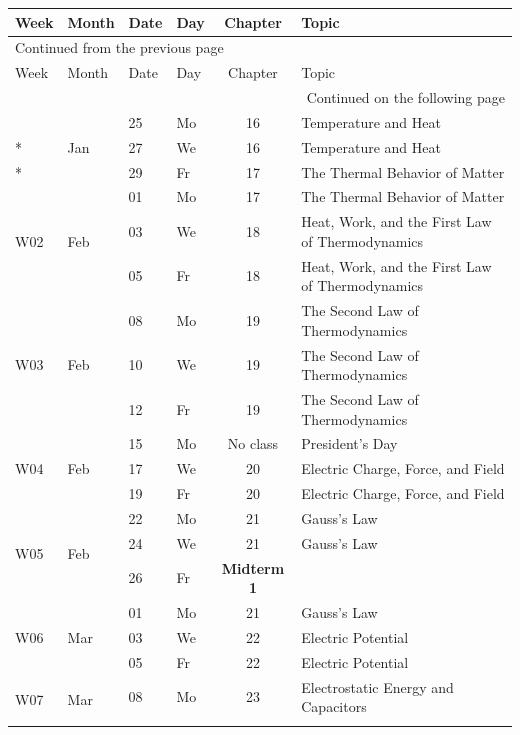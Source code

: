 \documentclass[12pt]{article}
\newcommand{\scheduleheading}{%
    Week & Month & Date & Day & Chapter & Topic \\ \hline
}
\begin{document}
\begin{longtable}{llllcl}
%
\scheduleheading
\endfirsthead
%
\multicolumn{6}{l}{Continued from the previous page} \\ \hline
\scheduleheading
\endhead
%
\multicolumn{6}{r}{Continued on the following page} \\
\endfoot
%
\endlastfoot
%
%
\multirow{3}{*}{W01}	&	\multirow{3}{*}{Jan}	&	25	&	Mo\rule{0pt}{11pt}	&	16	&	Temperature and Heat	\\*	
	&		&	27	&	We	&	16	&	Temperature and Heat	\\*	
	&		&	29	&	Fr	&	17	&	The Thermal Behavior of Matter	\\	\hline
\multirow{3}{*}{W02}	&	\multirow{3}{*}{Feb}	&	01	&	Mo\rule{0pt}{11pt}	&	17	&	The Thermal Behavior of Matter	\\*	
	&		&	03	&	We	&	18	&	Heat, Work, and the First Law of Thermodynamics	\\*	
	&		&	05	&	Fr	&	18	&	Heat, Work, and the First Law of Thermodynamics	\\	\hline
\multirow{3}{*}{W03}	&	\multirow{3}{*}{Feb}	&	08	&	Mo\rule{0pt}{11pt}	&	19	&	The Second Law of Thermodynamics  	\\*	
	&		&	10	&	We	&	19	&	The Second Law of Thermodynamics  	\\*	
	&		&	12	&	Fr	&	19	&	The Second Law of Thermodynamics  	\\	\hline
\multirow{3}{*}{W04}	&	\multirow{3}{*}{Feb}	&	15	&	Mo\rule{0pt}{11pt}	&	No class	&	President's Day	\\*	
	&		&	17	&	We	&	20	&	Electric Charge, Force, and Field	\\*	
	&		&	19	&	Fr	&	20	&	Electric Charge, Force, and Field	\\	\hline
\multirow{3}{*}{W05}	&	\multirow{3}{*}{Feb}	&	22	&	Mo\rule{0pt}{11pt}	&	21	&	Gauss’s Law	\\*	
	&		&	24	&	We	&	21	&	Gauss’s Law	\\*	
	&		&	26	&	Fr	&	\textbf{Midterm 1}	&		\\	\hline
\multirow{3}{*}{W06}	&	\multirow{3}{*}{Mar}	&	01	&	Mo\rule{0pt}{11pt}	&	21	&	Gauss’s Law	\\*	
	&		&	03	&	We	&	22	&	Electric Potential  	\\*	
	&		&	05	&	Fr	&	22	&	Electric Potential  	\\	\hline
\multirow{3}{*}{W07}	&	\multirow{3}{*}{Mar}	&	08	&	Mo\rule{0pt}{11pt}	&	23	&	Electrostatic Energy and Capacitors 	\\*	

\end{longtable}
\end{document}
